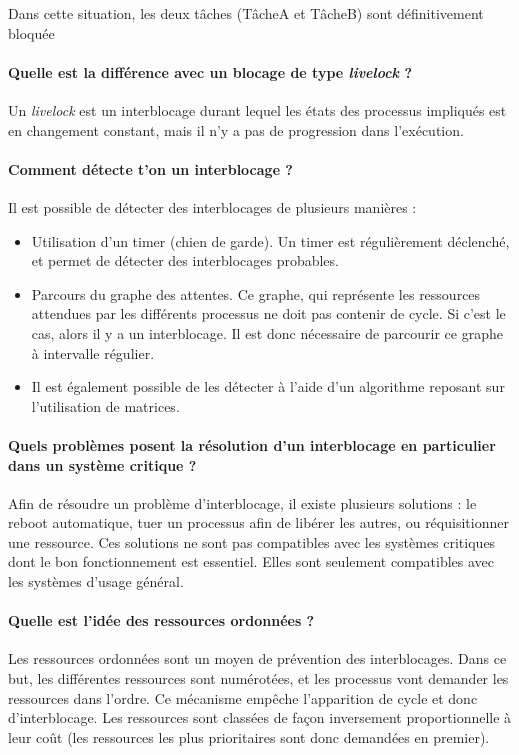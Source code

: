 \documentclass[a4paper]{article}
\begin{document}
Dans cette situation, les deux tâches (TâcheA et TâcheB) sont définitivement bloquée

\paragraph{Quelle est la différence avec un blocage de type \textit{livelock} ?}
Un \textit{livelock} est un interblocage durant lequel les états des processus impliqués est en changement constant, mais il n'y a pas de progression dans l'exécution.

\paragraph{Comment détecte t'on un interblocage ?}
Il est possible de détecter des interblocages de plusieurs manières :
\begin{itemize}
\item Utilisation d'un timer (chien de garde). Un timer est régulièrement déclenché, et permet de détecter des interblocages probables.
\item Parcours du graphe des attentes. Ce graphe, qui représente les ressources attendues par les différents processus ne doit pas contenir de cycle. Si c'est le cas, alors il y a un interblocage. Il est donc nécessaire de parcourir ce graphe à intervalle régulier.
\item Il est également possible de les détecter à l'aide d'un algorithme reposant sur l'utilisation de matrices.
\end{itemize}

\paragraph{Quels problèmes posent la résolution d'un interblocage en particulier dans un système critique ?}
Afin de résoudre un problème d'interblocage, il existe plusieurs solutions : le reboot automatique, tuer un processus afin de libérer les autres, ou réquisitionner une ressource. Ces solutions ne sont pas compatibles avec les systèmes critiques dont le bon fonctionnement est essentiel. Elles sont seulement compatibles avec les systèmes d'usage général.

\paragraph{Quelle est l'idée des ressources ordonnées ?}
Les ressources ordonnées sont un moyen de prévention des interblocages. Dans ce but, les différentes ressources sont numérotées, et les processus vont demander les ressources dans l'ordre. Ce mécanisme empêche l'apparition de cycle et donc d'interblocage. Les ressources sont classées de façon inversement proportionnelle à leur coût (les ressources les plus prioritaires sont donc demandées en premier).
\end{document}
